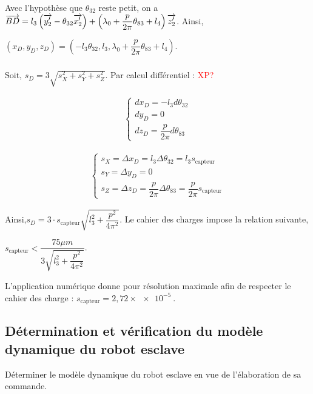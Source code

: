 \documentclass[10pt,fleqn]{article} %
\begin{document}
 Avec l'hypothèse que $\theta_{32}$ reste petit, on a  $\overrightarrow{BD}=l_3\left(  \overrightarrow{y_2'} - \theta_{32} \overrightarrow{x_2'}  \right)+\left( \lambda_0 + \dfrac{p}{2\pi} \theta_{83} +l_4\right)\overrightarrow{z_2'}$.
  Ainsi,
  
  $\left(x_D,y_D,z_D\right)=
\left(-l_3 \theta_{32},l_3, \lambda_0 + \dfrac{p}{2\pi} \theta_{83} +l_4\right)$.

\subparagraph{}%

Soit, $s_D=3\sqrt{s_X^2+s_Y^2+s_Z^2}$. Par calcul différentiel :  \textcolor{red}{XP?}

\begin{minipage}{0.5\textwidth}
\begin{align*}
\left\{
\begin{array}{c}
dx_D=-l_3d\theta_{32}\\
dy_D=0\\
dz_D=\dfrac{p}{2\pi}d\theta_{83}
\end{array}
\right.
\end{align*}
\end{minipage}
\begin{minipage}{0.5\textwidth}

\begin{align*}
\left\{
\begin{array}{c}
s_X=\Delta x_D=l_3\Delta \theta_{32}=l_3 s_{\text{capteur}}\\
s_Y=\Delta y_D=0\\
s_Z=\Delta z_D=\dfrac{p}{2\pi}\Delta \theta_{83}=\dfrac{p}{2\pi}s_{\text{capteur}}
\end{array}
\right.
\end{align*}
\end{minipage}

Ainsi,$
s_D=3\cdot s_{\text{capteur}}\sqrt{l_3^2+\dfrac{p^2}{4\pi^2}}
$.
Le cahier des charges impose la relation suivante,

$
s_{\text{capteur}}<\dfrac{75\mu m}{3\sqrt{l_3^2+\dfrac{p^2}{4\pi^2}}}
$.

L'application numérique donne pour résolution maximale afin de respecter le cahier des charge :  $s_{\text{capteur}}=2,72\times \SI{e-5}{}$.


\subsection{Détermination et vérification du modèle dynamique du robot esclave}
\begin{obj}
Déterminer le modèle dynamique du robot esclave en vue de l’élaboration de sa commande.
\end{obj}
\end{document}
